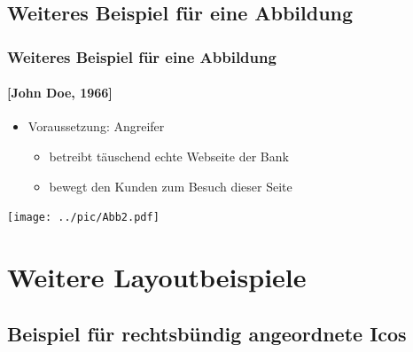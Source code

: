 \documentclass[t,aspectratio=169]{beamer}
\begin{document}
\subsection{Weiteres Beispiel für eine Abbildung} %

\begin{frame}
	\frametitle{Weiteres Beispiel für eine Abbildung}
	\framesubtitle{[John Doe, 1966]}
	\begin{itemize}
		\item Voraussetzung: {\color{black} Angreifer} 
			\begin{itemize}
				\item betreibt täuschend echte Webseite der Bank
				\item bewegt den Kunden zum Besuch dieser Seite
			\end{itemize}
	\end{itemize}
	\vspace{\fill}
	\begin{center}
		\texttt{[image: ../pic/Abb2.pdf]}
	\end{center}
\end{frame}

\section{Weitere Layoutbeispiele} %
\subsection{Beispiel für rechtsbündig angeordnete Icos} %
\end{document}
